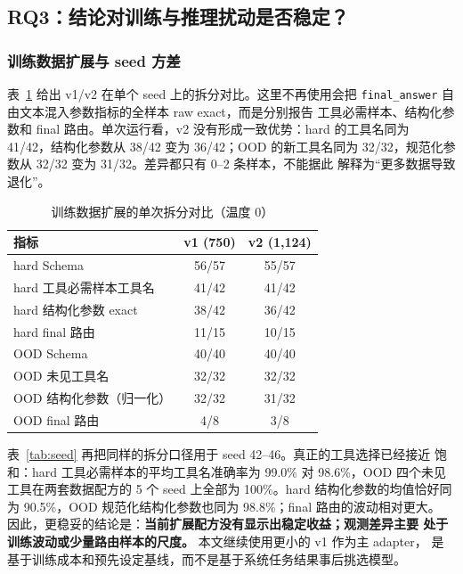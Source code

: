 \documentclass[UTF8,a4paper,12pt]{ctexart}
\begin{document}
\subsection{RQ3：结论对训练与推理扰动是否稳定？}
\subsubsection{训练数据扩展与 seed 方差}
表~\ref{tab:v2} 给出 v1/v2 在单个 seed 上的拆分对比。这里不再使用会把
\texttt{final\_answer} 自由文本混入参数指标的全样本 raw exact，而是分别报告
工具必需样本、结构化参数和 final 路由。单次运行看，v2 没有形成一致优势：hard
的工具名同为 41/42，结构化参数从 38/42 变为 36/42；OOD 的新工具名同为
32/32，规范化参数从 32/32 变为 31/32。差异都只有 0--2 条样本，不能据此
解释为“更多数据导致退化”。

\begin{table}[H]
  \centering
  \small
  \caption{训练数据扩展的单次拆分对比（温度 0）}
  \label{tab:v2}
  \begin{tabular}{lcc}
    \toprule
    指标 & v1 (750) & v2 (1,124) \\
    \midrule
    hard Schema & 56/57 & 55/57 \\
    hard 工具必需样本工具名 & 41/42 & 41/42 \\
    hard 结构化参数 exact & 38/42 & 36/42 \\
    hard final 路由 & 11/15 & 10/15 \\
    OOD Schema & 40/40 & 40/40 \\
    OOD 未见工具名 & 32/32 & 32/32 \\
    OOD 结构化参数（归一化） & 32/32 & 31/32 \\
    OOD final 路由 & 4/8 & 3/8 \\
    \bottomrule
  \end{tabular}
\end{table}

表~\ref{tab:seed} 再把同样的拆分口径用于 seed 42--46。真正的工具选择已经接近
饱和：hard 工具必需样本的平均工具名准确率为 99.0\% 对 98.6\%，OOD 四个未见
工具在两套数据配方的 5 个 seed 上全部为 100\%。hard 结构化参数的均值恰好同为
90.5\%，OOD 规范化结构化参数也同为 98.8\%；final 路由的波动相对更大。
因此，更稳妥的结论是：\textbf{当前扩展配方没有显示出稳定收益；观测差异主要
处于训练波动或少量路由样本的尺度。} 本文继续使用更小的 v1 作为主 adapter，
是基于训练成本和预先设定基线，而不是基于系统任务结果事后挑选模型。
\end{document}
